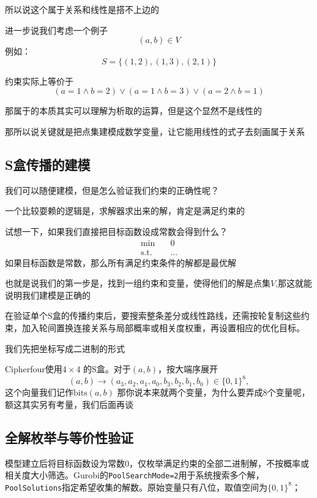 所以说这个属于关系和线性是搭不上边的

进一步说我们考虑一个例子
\[
(a,b)\in V
\]
例如：
\[
S=\{(1,2),(1,3),(2,1)\}
\]

约束实际上等价于
\[
(a=1\land b=2)
\lor
(a=1\land b=3)
\lor
(a=2\land b=1)
\]

那属于的本质其实可以理解为析取的运算，但是这个显然不是线性的

那所以说关键就是把点集建模成数学变量，让它能用线性的式子去刻画属于关系
\subsection{S盒传播的建模}
\label{subsec:lab4-modeling-conventions}

我们可以随便建模，但是怎么验证我们约束的正确性呢？

一个比较耍赖的逻辑是，求解器求出来的解，肯定是满足约束的

试想一下，如果我们直接把目标函数设成常数会得到什么？
\begin{equation}
\begin{aligned}
\min\quad &0\\
\text{s.t.}\quad & ...
\end{aligned}
\end{equation}
如果目标函数是常数，那么所有满足约束条件的解都是最优解

也就是说我们的第一步是，找到一组约束和变量，使得他们的解是点集$V$,那这就能说明我们建模是正确的

在验证单个S盒的传播约束后，要搜索整条差分或线性路线，还需按轮复制这些约束，加入轮间置换连接关系与局部概率或相关度权重，再设置相应的优化目标。

我们先把坐标写成二进制的形式

Cipherfour使用$4\times4$ 的S盒。对于$(a,b)$，按大端序展开
\[
(a,b)\rightarrow (a_3,a_2,a_1,a_0,b_3,b_2,b_1,b_0)\in\{0,1\}^{8},
\]
这个向量我们记作$\text{bits}(a,b)$
那你说本来就两个变量，为什么要弄成8个变量呢，额这其实另有考量，我们后面再谈






\subsection{全解枚举与等价性验证}

模型建立后将目标函数设为常数$0$，仅枚举满足约束的全部二进制解，不按概率或相关度大小筛选。Gurobi的\texttt{PoolSearchMode=2}用于系统搜索多个解，\texttt{PoolSolutions}指定希望收集的解数。原始变量只有八位，取值空间为$\{0,1\}^{8}$；

